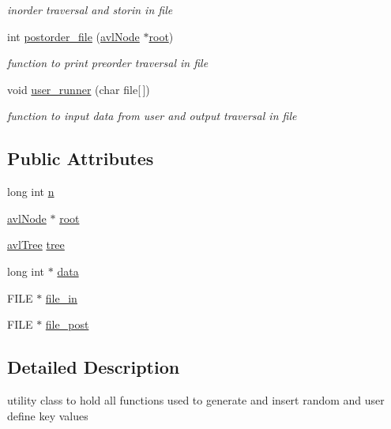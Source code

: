 \begin{DoxyCompactItemize}
\begin{DoxyCompactList}\small\item\em inorder traversal and storin in file \end{DoxyCompactList}\item 
int \hyperlink{class_a_v_ltree_1_1utility_a17d9c75eb6369f275ebc78e8a22fdfe2}{postorder\-\_\-file} (\hyperlink{namespace_a_v_ltree_a563d9b152f0d58a69308eeec8d716882}{avl\-Node} $\ast$\hyperlink{class_a_v_ltree_1_1utility_ad280714781d2107450345a21a1363931}{root})
\begin{DoxyCompactList}\small\item\em function to print preorder traversal in file \end{DoxyCompactList}\item 
void \hyperlink{class_a_v_ltree_1_1utility_a12455791d9c279a57167cb8b9cba41bf}{user\-\_\-runner} (char file\mbox{[}$\,$\mbox{]})
\begin{DoxyCompactList}\small\item\em function to input data from user and output traversal in file \end{DoxyCompactList}\end{DoxyCompactItemize}
\subsection*{Public Attributes}
\begin{DoxyCompactItemize}
\item 
long int \hyperlink{class_a_v_ltree_1_1utility_a670d69758bb1e9d12b4201b7ec9af69a}{n}
\item 
\hyperlink{namespace_a_v_ltree_a563d9b152f0d58a69308eeec8d716882}{avl\-Node} $\ast$ \hyperlink{class_a_v_ltree_1_1utility_ad280714781d2107450345a21a1363931}{root}
\item 
\hyperlink{class_a_v_ltree_1_1avl_tree}{avl\-Tree} \hyperlink{class_a_v_ltree_1_1utility_a7229b90aa265e8b738654dd3c603c97d}{tree}
\item 
long int $\ast$ \hyperlink{class_a_v_ltree_1_1utility_ae961bda1734f4a212da0630f83b0be8e}{data}
\item 
F\-I\-L\-E $\ast$ \hyperlink{class_a_v_ltree_1_1utility_a6be49cbfc023f06696dd28c590b086ac}{file\-\_\-in}
\item 
F\-I\-L\-E $\ast$ \hyperlink{class_a_v_ltree_1_1utility_a1e622d73b2fb80fa422f6f102519cef8}{file\-\_\-post}
\end{DoxyCompactItemize}


\subsection{Detailed Description}
utility class to hold all functions used to generate and insert random and user define key values 

